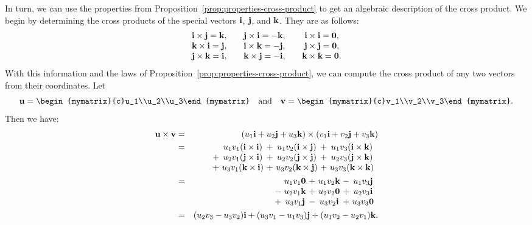 In turn, we can use the properties from
Proposition~\ref{prop:properties-cross-product} to get an algebraic
description of the cross product. We begin by determining the cross
products of the special vectors $\vect{i}$, $\vect{j}$, and
$\vect{k}$. They are as follows:
\begin{equation*}
  \begin{array}{c@{\quad\quad}c@{\quad\quad}c}
    \vect{i}\times \vect{j}=\vect{k},
    & \vect{j}\times \vect{i}=-\vect{k},
    & \vect{i}\times \vect{i}=\vect{0}, \\
    \vect{k}\times \vect{i}=\vect{j},
    & \vect{i}\times \vect{k}=-\vect{j},
    & \vect{j}\times \vect{j}=\vect{0}, \\
    \vect{j}\times \vect{k}=\vect{i},
    & \vect{k}\times \vect{j}=-\vect{i},
    & \vect{k}\times \vect{k}=\vect{0}.
  \end{array}
\end{equation*}
With this information and the laws of
Proposition~\ref{prop:properties-cross-product}, we can compute the
cross product of any two vectors from their coordinates.%
 Let
\begin{equation*}
  \vect{u}=\begin{mymatrix}{c}u_1\\u_2\\u_3\end{mymatrix}
  \quad\mbox{and}\quad
  \vect{v}=\begin{mymatrix}{c}v_1\\v_2\\v_3\end{mymatrix}.
\end{equation*}
Then we have:
\begin{eqnarray*}
  \vect{u}\times\vect{v}
  &=& (u_1\vect{i}+u_2\vect{j}+u_3\vect{k})\times (v_1\vect{i}+v_2\vect{j}+v_3\vect{k}) \\
  &=& \begin{array}[t]{@{}c@{~}c@{~}c@{~}c@{~}c@{~}c}
        & u_1v_1(\vect{i}\times\vect{i})
        &+& u_1v_2(\vect{i}\times\vect{j})
        &+& u_1v_3(\vect{i}\times\vect{k}) \\
        +& u_2v_1(\vect{j}\times\vect{i})
        &+& u_2v_2(\vect{j}\times\vect{j})
        &+& u_2v_3(\vect{j}\times\vect{k}) \\
        +& u_3v_1(\vect{k}\times\vect{i})
        &+& u_3v_2(\vect{k}\times\vect{j})
        &+& u_3v_3(\vect{k}\times\vect{k})
      \end{array}
  \\
  &=&\begin{array}[t]{@{}c@{~}c@{~}c@{~}c@{~}c@{~}c}
       & u_1v_1\vect{0}
       &+& u_1v_2\vect{k}
       &-& u_1v_3\vect{j} \\
       -& u_2v_1\vect{k}
       &+& u_2v_2\vect{0}
       &+& u_2v_3\vect{i} \\
       +& u_3v_1\vect{j}
       &-& u_3v_2\vect{i}
       &+& u_3v_3\vect{0}
     \end{array}
  \\
  &=& (u_2v_3-u_3v_2) \vect{i}+
      (u_3v_1 - u_1v_3) \vect{j}+
      (u_1v_2-u_2v_1) \vect{k}.
\end{eqnarray*}
